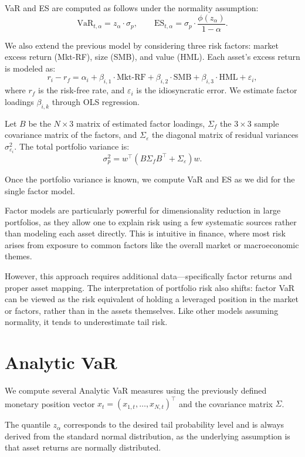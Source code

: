 \documentclass[12pt]{article}
\begin{document}
VaR and ES are computed as follows under the normality assumption:
\[
\text{VaR}_{t,\alpha} = z_\alpha \cdot \sigma_p, \qquad
\text{ES}_{t,\alpha} = \sigma_p \cdot \frac{\phi(z_\alpha)}{1 - \alpha}.
\]

We also extend the previous model by considering three risk factors: market excess return (Mkt-RF), size (SMB), and value (HML). Each asset’s excess return is modeled as:
\[
r_i - r_f = \alpha_i + \beta_{i,1} \cdot \text{Mkt-RF} + \beta_{i,2} \cdot \text{SMB} + \beta_{i,3} \cdot \text{HML} + \varepsilon_i,
\]
where $r_f$ is the risk-free rate, and $\varepsilon_i$ is the idiosyncratic error. We estimate factor loadings $\beta_{i,k}$ through OLS regression.

Let $B$ be the $N \times 3$ matrix of estimated factor loadings, $\Sigma_f$ the $3 \times 3$ sample covariance matrix of the factors, and $\Sigma_\varepsilon$ the diagonal matrix of residual variances $\sigma_{\varepsilon_i}^2$. The total portfolio variance is:
\[
\sigma_p^2 = w^\top (B \Sigma_f B^\top + \Sigma_\varepsilon) w.
\]

Once the portfolio variance is known, we compute VaR and ES as we did for the single factor model.

Factor models are particularly powerful for dimensionality reduction in large portfolios, as they allow one to explain risk using a few systematic sources rather than modeling each asset directly. This is intuitive in finance, where most risk arises from exposure to common factors like the overall market or macroeconomic themes.

However, this approach requires additional data—specifically factor returns and proper asset mapping. The interpretation of portfolio risk also shifts: factor VaR can be viewed as the risk equivalent of holding a leveraged position in the market or factors, rather than in the assets themselves. Like other models assuming normality, it tends to underestimate tail risk.


\section{Analytic VaR}

We compute several Analytic VaR measures using the previously defined monetary position vector \( x_t = (x_{1,t}, \dots, x_{N,t})^\top \) and the covariance matrix \( \Sigma \). 

The quantile \( z_\alpha \) corresponds to the desired tail probability level and is always derived from the standard normal distribution, as the underlying assumption is that asset returns are normally distributed.
\end{document}
